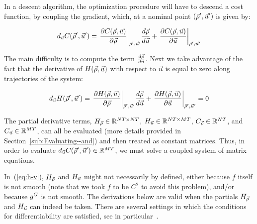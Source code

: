 In a descent algorithm, the optimization procedure will have to descend
a cost function, by coupling the gradient, which, at a nominal point
$\left(\nominal{\state},\nominal{\control}\right)$ is given by:

\begin{equation}
d_{\control}\cost\left(\nominal{\state},\nominal{\control}\right)=\evaluate{\pfrac{\cost\text{\ensuremath{\left(\state,\control\right)}}}{\state}}{\nominal{\state},\nominal{\control}}\Dfrac{\state}{\control}+\evaluate{\pfrac{\cost\text{\ensuremath{\left(\state,\control\right)}}}{\control}}{\nominal{\state},\nominal{\control}}\label{eq:j-v}
\end{equation}


The main difficulty is to compute the term $\frac{d\vec{\rho}}{d\vec{u}}$.
Next we take advantage of the fact that the derivative of $H\left(\state,\control\right)$
with respect to $\vec{u}$ is equal to zero along trajectories of
the system:

\begin{equation}
d_{\control}\sys\left(\nominal{\state},\nominal{\control}\right)=\evaluate{\pfrac{\sys\text{\ensuremath{\left(\state,\control\right)}}}{\state}}{\nominal{\state},\nominal{\control}}\Dfrac{\state}{\control}+\evaluate{\pfrac{\sys\text{\ensuremath{\left(\state,\control\right)}}}{\control}}{\nominal{\state},\nominal{\control}}=0\label{eq:h-v}
\end{equation}


The partial derivative terms, $H_{\vec{\rho}}\in\mathbb{R}^{NT\times NT}$,
$H_{\vec{u}}\in\mathbb{R}^{NT\times MT}$, $C_{\vec{\rho}}\in\mathbb{R}^{NT}$,
and $C_{\vec{u}}\in\mathbb{R}^{MT}$, can all be evaluated (more
details provided in Section~\ref{sub:Evaluating--and}) and then
treated as constant matrices. Thus, in order to evaluate $d_{\control}\cost\left(\nominal{\state},\nominal{\control}\right)\in\mathbb{R}^{\ncontrols\ntime}$,
we must solve a coupled system of matrix equations.
\begin{note}
In~(\ref{eq:h-v}), $H_{\vec{\rho}}$ and $H_{\vec{u}}$ might not necessarily by defined,
either because $f$ itself is not smooth (note that we took $f$ to
be $C^{2}$ to avoid this problem), and/or because $g^{G}$ is not
smooth. The derivations below are valid when the partials $H_{\vec{\rho}}$ and
$H_{\vec{u}}$ can indeed be taken. There are several settings in which the
conditions for differentiability are satisfied, see in particular~\cite{Gugat2005,Flasskamp2012}.
\end{note}

